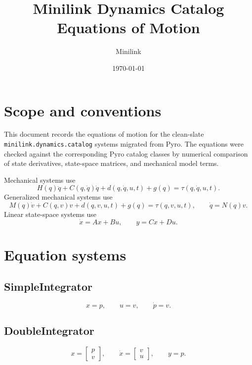 \documentclass[11pt]{article}
\title{Minilink Dynamics Catalog Equations of Motion}
\author{Minilink}
\date{\today}
\begin{document}
\maketitle

\section*{Scope and conventions}
This document records the equations of motion for the clean-slate
\texttt{minilink.dynamics.catalog} systems migrated from Pyro.  The equations
were checked against the corresponding Pyro catalog classes by numerical
comparison of state derivatives, state-space matrices, and mechanical model
terms.

Mechanical systems use
\begin{equation}
    H(q)\ddot q + C(q,\dot q)\dot q + d(q,\dot q,u,t) + g(q)
    = \tau(q,\dot q,u,t).
\end{equation}
Generalized mechanical systems use
\begin{equation}
    M(q)\dot v + C(q,v)v + d(q,v,u,t) + g(q) = \tau(q,v,u,t),
    \qquad
    \dot q = N(q)v.
\end{equation}
Linear state-space systems use
\begin{equation}
    \dot x = A x + B u,
    \qquad
    y = Cx + Du.
\end{equation}

\section{Equation systems}

\subsection{SimpleIntegrator}
\begin{equation}
    x = p, \qquad u = v, \qquad \dot p = v.
\end{equation}

\subsection{DoubleIntegrator}
\begin{equation}
    x = \begin{bmatrix} p \\ v \end{bmatrix},
    \qquad
    \dot x = \begin{bmatrix} v \\ u \end{bmatrix},
    \qquad
    y = p.
\end{equation}
\end{document}
